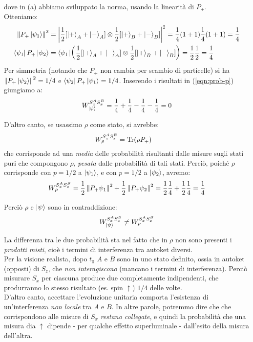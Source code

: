 \documentclass[../../FisicaTeorica.tex]{subfiles}
\begin{document}
dove in (a) abbiamo sviluppato la norma, usando la linearità di $P_+$.\\
Otteniamo:
\begin{align*}
\left\lVert P_+\Ket{\psi_1}\right\rVert^2 &= \left|
\frac{1}{2}[\Ket{+}_A+\Ket{-}_A] \otimes \frac{1}{2}[\Ket{+}_B+\Ket{-}_B]
\right|^2 = \frac{1}{4}(1+1)\frac{1}{4}(1+1) =\frac{1}{4}\\
\Bra{\psi_1}P_+ \Ket{\psi_2} &= \Bra{\psi_1} \left(\frac{1}{2}[\Ket{+}_A+\Ket{-}_A] \otimes \frac{1}{2}[\Ket{+}_B+\Ket{-}_B] \right)
= \frac{1}{2}\frac{1}{2} = \frac{1}{4}
\end{align*}
Per simmetria (notando che $P_+$ non cambia per scambio di particelle) si ha $\left\lVert P_+\Ket{\psi_2}\right\rVert^2=1/4$ e $\Bra{\psi_2}P_+\Ket{\psi_1}=1/4$. Inserendo i risultati in (\ref{eqn:prob-p}) giungiamo a:
\begin{align*}
W_{\Ket{\psi}}^{S_x^A S_x^B} = \frac{1}{4} + \frac{1}{4} - \frac{1}{4} - \frac{1}{4} = 0
\end{align*}

D'altro canto, se usassimo $\rho$ come stato, si avrebbe:
\begin{align*}
W_\rho^{S_x^A S_x^B} &= \operatorname{Tr}(\rho P_+) 
\end{align*}
che corrisponde ad una \textit{media} delle probabilità risultanti dalle misure sugli stati puri che compongono $\rho$, \textit{pesata} dalle probabilità di tali stati. Perciò, poiché $\rho$ corrisponde con $p=1/2$ a $\Ket{\psi_1}$, e con $p=1/2$ a $\Ket{\psi_2}$, avremo:
\begin{align*}
W_\rho^{S_x^A S_x^B} = \frac{1}{2}\left\lVert P_+ \psi_1\right\rVert^2 + \frac{1}{2}\left\lVert P_+ \psi_2\right\rVert^2 = \frac{1}{2}\frac{1}{4} + \frac{1}{2}\frac{1}{4} = \frac{1}{4}
\end{align*}

Perciò $\rho$ e $\Ket{\psi}$ sono in contraddizione:
\begin{align*}
W_{\Ket{\psi}}^{S_x^AS_x^B} \neq W_\rho^{S_x^AS_x^B}
\end{align*}

La differenza tra le due probabilità sta nel fatto che in $\rho$ non sono presenti i \textit{prodotti misti}, cioè i termini di interferenza tra autoket diversi.\\
Per la visione realista, dopo $t_0$ $A$ e $B$ sono in uno stato definito, ossia in autoket (opposti) di $S_z$, che \textit{non interagiscono} (mancano i termini di interferenza). Perciò misurare $S_x$ per ciascuna produce due  completamente indipendenti, che produrranno lo stesso risultato (es. spin $\uparrow$) $1/4$ delle volte.\\
D'altro canto, accettare l'evoluzione unitaria comporta l'esistenza di un'interferenza \textit{non locale} tra $A$ e $B$. In altre parole, potremmo dire che  che corrispondono alle misure di $S_x$ \textit{restano collegate}, e quindi la probabilità che una misura dia $\uparrow$ dipende - per qualche effetto superluminale - dall'esito della misura dell'altra.
\end{document}
